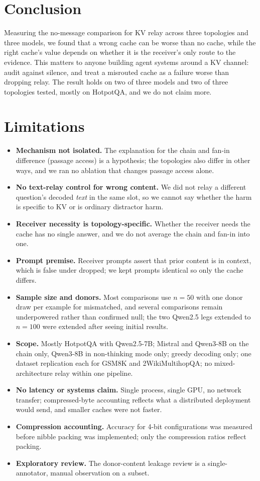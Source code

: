\documentclass[11pt]{article}
\begin{document}
\section{Conclusion}

Measuring the no-message comparison for KV relay across three topologies and
three models, we found that a wrong cache can be worse than no cache, while
the right cache's value depends on whether it is the receiver's only route
to the evidence.
This matters to anyone building agent systems around a KV channel: audit
against silence, and treat a misrouted cache as a failure worse than
dropping relay. The result holds on two of three models and two of three
topologies tested, mostly on HotpotQA, and we do not claim more.

\section*{Limitations}
\label{sec:limitations}

\begin{itemize}[leftmargin=*,itemsep=1pt]
\item \textbf{Mechanism not isolated.} The explanation for the chain and
fan-in difference (passage access) is a hypothesis; the topologies also
differ in other ways, and we ran no ablation that changes passage access
alone.
\item \textbf{No text-relay control for wrong content.} We did not relay
a different question's decoded \emph{text} in the same slot, so we cannot
say whether the harm is specific to KV or is ordinary distractor harm.
\item \textbf{Receiver necessity is topology-specific.} Whether the
receiver needs the cache has no single answer, and we do not average the
chain and fan-in into one.
\item \textbf{Prompt premise.} Receiver prompts assert that prior content
is in context, which is false under dropped; we kept prompts identical so
only the cache differs.
\item \textbf{Sample size and donors.} Most comparisons use $n{=}50$ with
one donor draw per example for mismatched, and several comparisons remain
underpowered rather than confirmed null; the two Qwen2.5 legs extended to
$n{=}100$ were extended after seeing initial results.
\item \textbf{Scope.} Mostly HotpotQA with Qwen2.5-7B; Mistral and
Qwen3-8B on the chain only, Qwen3-8B in non-thinking mode only; greedy
decoding only; one dataset replication each for GSM8K and
2WikiMultihopQA; no mixed-architecture relay within one pipeline.
\item \textbf{No latency or systems claim.} Single process, single GPU,
no network transfer; compressed-byte accounting reflects what a
distributed deployment would send, and smaller caches were not faster.
\item \textbf{Compression accounting.} Accuracy for 4-bit configurations
was measured before nibble packing was implemented; only the compression
ratios reflect packing.
\item \textbf{Exploratory review.} The donor-content leakage review is a
single-annotator, manual observation on a subset.
\end{itemize}
\end{document}
